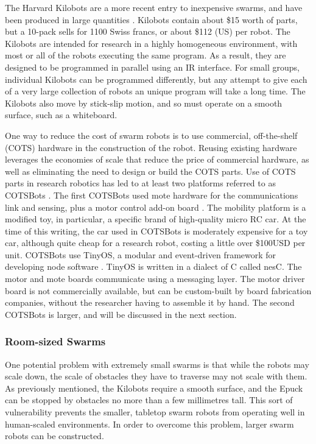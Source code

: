 \documentclass[]{article}
\begin{document}
The Harvard Kilobots are a more recent entry to inexpensive swarms, and have been produced in large quantities \cite{rubenstein2014kilobot}. 
Kilobots contain about \$15 worth of parts, but a 10-pack sells for 1100 Swiss francs, or about \$112 (US) per robot. 
The Kilobots are intended for research in a highly homogeneous environment, with most or all of the robots executing the same program. 
As a result, they are designed to be programmed in parallel using an IR interface. 
For small groups, individual Kilobots can be programmed differently, but any attempt to give each of a very large collection of robots an unique program will take a long time. 
The Kilobots also move by stick-slip motion, and so must operate on a smooth surface, such as a whiteboard. 

One way to reduce the cost of swarm robots is to use commercial, off-the-shelf (COTS) hardware in the construction of the robot. 
Reusing existing hardware leverages the economies of scale that reduce the price of commercial hardware, as well as eliminating the need to design or build the COTS parts. 
Use of COTS parts in research robotics has led to at least two platforms referred to as COTSBots \cite{bergbreiter2003cotsbots, soule2011cotsbots}.
The first COTSBots used mote hardware for the communications link and sensing, plus a motor control add-on board \cite{bergbreiter2003cotsbots}. 
The mobility platform is a modified toy, in particular, a specific brand of high-quality micro RC car.
At the time of this writing, the car used in COTSBots is moderately expensive for a toy car, although quite cheap for a research robot, costing a little over \$100USD per unit. 
COTSBots use TinyOS, a modular and event-driven framework for developing node software \cite{levis2005tinyos}. 
TinyOS is written in a dialect of C called nesC. The motor and mote boards communicate using a messaging layer. 
The motor driver board is not commercially available, but can be custom-built by board fabrication companies, without the researcher having to assemble it by hand. 
The second COTSBots is larger, and will be discussed in the next section. 

\subsubsection{Room-sized Swarms}

One potential problem with extremely small swarms is that while the robots may scale down, the scale of obstacles they have to traverse may not scale with them. 
As previously mentioned, the Kilobots require a smooth surface, and the Epuck can be stopped by obstacles no more than a few millimetres tall. 
This sort of vulnerability prevents the smaller, tabletop swarm robots from operating well in human-scaled environments. 
In order to overcome this problem, larger swarm robots can be constructed.
 
\end{document}
